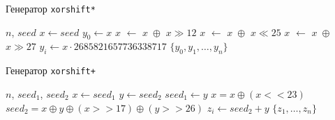 \documentclass[%
floatfix,
showkeys,
nofootinbib, %
superscriptaddress, %
]{revtex4-1}
\begin{document}
\begin{minipage}[t]{0.5\textwidth}
        \vspace{-10pt}
        \begin{algorithm}[H]
                \begin{algorithmic}
                        \caption{Генератор \texttt{xorshift*}}\label{alg:xorshift64star}
                        \Require $n$, $seed$
                        \State $x \leftarrow seed$
                        \State $y_{0} \leftarrow x$
                                \State $x$ $\leftarrow$ $x\; \oplus$ $x \gg 12$
                                \State $x$ $\leftarrow$ $x\; \oplus$ $x \ll 25$
                                \State $x$ $\leftarrow$ $x\; \oplus$ $x \gg 27$
                                \State $y_{i} \leftarrow  x \cdot 2685821657736338717$ 
                        \EndFor
                        \State \Return $\{y_{0}, y_{1}, \ldots, y_{n}\}$
                \end{algorithmic}
        \end{algorithm}
\end{minipage}
\begin{minipage}[t]{0.5\textwidth}
        \vspace{-10pt}
        \begin{algorithm}[H]
                \caption{Генератор \texttt{xorshift+}}\label{alg:xorshift128plus}
                \begin{algorithmic}
                        \Require $n$, $seed_{1}$, $seed_{2}$
                                \State $x \leftarrow seed_{1}$
                                \State $y \leftarrow seed_{2}$
                                \State $seed_{1} \leftarrow y$
                                \State $x = x \oplus (x << 23)$
                                \State $seed_{2} = x \oplus y \oplus (x >> 17) \oplus (y >> 26)$
                                \State $z_{i} \leftarrow seed_{2} + y$
                        \EndFor
                        \State \Return $\{z_{1},\ldots,z_{n}\}$
                \end{algorithmic}
        \end{algorithm}
\end{minipage}
\end{document}
